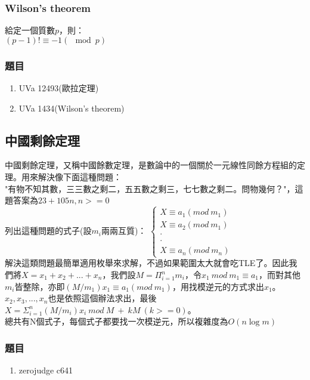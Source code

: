 \subsubsection{Wilson's theorem}
給定一個質數$p$，則：\\
$(p-1)!\equiv -1 (\mod p)$
\subsubsection{題目}
\begin{enumerate}
\item UVa 12493(歐拉定理)
\item UVa 1434(Wilson's theorem)
\end{enumerate}
\subsection{中國剩餘定理}
中國剩餘定理，又稱中國餘數定理，是數論中的一個關於一元線性同餘方程組的定理。用來解決像下面這種問題：\\
"有物不知其數，三三數之剩二，五五數之剩三，七七數之剩二。問物幾何？"，這題答案為$23+105n,n>=0$\\
列出這種問題的式子(設$m_i$兩兩互質)：
$\left \{ \begin{matrix} X\equiv a_1 (mod\ m_1)\\ X\equiv a_2 (mod\ m_1)\\ \cdot \\ \cdot \\ X\equiv a_n (mod\ m_n)\end{matrix}\right.$\\
解決這類問題最簡單適用枚舉來求解，不過如果範圍太大就會吃TLE了。因此我們將$X=x_1+x_2+...+x_n$，我們設$M=\Pi_{i=1}^{n} m_i$，令$x_1\ mod\ m_1\equiv a_1$，而對其他$m_i$皆整除，亦即$(M/m_1)x_1\equiv a_1 (mod\ m_1)$，用找模逆元的方式求出$x_1$。$x_2,x_3,...,x_n$也是依照這個辦法求出，最後$X=\Sigma_{i=1}^{n} (M/m_i)x_i\ mod\ M\ +\ kM\ (k>=0)$。\\
總共有N個式子，每個式子都要找一次模逆元，所以複雜度為$O(n \log m)$
\subsubsection{題目}
\begin{enumerate}
\item zerojudge c641
\end{enumerate}